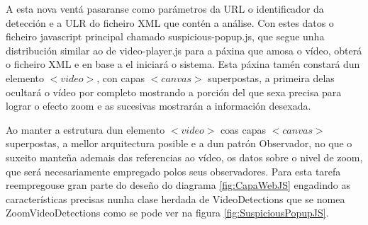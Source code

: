     A esta nova ventá pasaranse como parámetros da URL o identificador da detección e a ULR do 
    ficheiro XML que contén a análise. Con estes datos o ficheiro javascript principal chamado
    suspicious-popup.js, que segue unha distribución similar ao de video-player.js para a páxina
    que amosa o vídeo, obterá o ficheiro XML e en base a el iniciará o sistema. Esta
    páxina tamén constará dun elemento $<video>$, con capas $<canvas>$ superpostas, a primeira delas 
    ocultará o vídeo por completo mostrando a porción del que sexa precisa para lograr o efecto 
    zoom e as sucesivas mostrarán a información desexada.
    
    Ao manter a estrutura dun elemento $<video>$ coas capas $<canvas>$ superpostas, a mellor 
    arquitectura posible e a dun patrón Observador, no que o suxeito manteña ademais das referencias
    ao vídeo, os datos sobre o nivel de zoom, que será necesariamente empregado polos seus 
    observadores. Para esta tarefa reempregouse gran parte do deseño do diagrama \ref{fig:CapaWebJS}
    engadindo as características precisas nunha clase herdada de VideoDetections que se nomea 
    ZoomVideoDetections como se pode ver na figura \ref{fig:SuspiciousPopupJS}.
    
